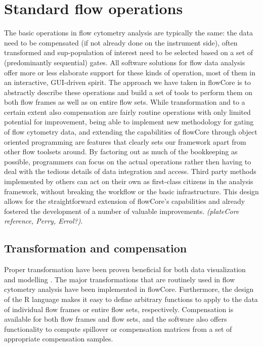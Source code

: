 \documentclass[12pt]{article}
\begin{document}
\section*{Standard flow operations}
The basic operations in flow cytometry analysis are typically the
same: the data need to be compensated (if not already done on the
instrument side), often transformed and sup-population of interest
need to be selected based on a set of (predominantly sequential)
gates. All software solutions for flow data analysis offer more or
less elaborate support for these kinds of operation, most of them in
an interactive, GUI-driven spirit. The approach we have taken in
flowCore is to abstractly describe these operations and build a set of
tools to perform them on both flow frames as well as on entire flow
sets. While transformation and to a certain extent also compensation
are fairly routine operations with only limited potential for
improvement, being able to implement new methodology for gating of
flow cytometry data, and extending the capabilities of flowCore
through object oriented programming are features that clearly sets our
framework apart from other flow toolsets around. By factoring out as
much of the bookkeeping as possible, programmers can focus on the
actual operations rather then having to deal with the tedious details
of data integration and access. Third party methods implemented by
others can act on their own as first-class citizens in the analysis
framework, without breaking the workflow or the basic
infrastructure. This design allows for the straightforward extension
of flowCore's capabilities and already fostered the development of a
number of valuable improvements. \citep{lo2008agf,sarkar2008ufv}
\textit{(plateCore reference, Perry, Errol?)}.




\subsection*{Transformation and compensation}
Proper transformation have been proven beneficial for both data
visualization and modelling \citep{lo2008agf}. The major
transformations that are routinely used in flow cytometry analysis
have been implemented in flowCore. Furthermore, the design of the R
language makes it easy to define arbitrary functions to apply to the
data of individual flow frames or entire flow sets,
respectively. Compensation is available for both flow frames and flow
sets, and the software also offers functionality to compute spillover
or compensation matrices from a set of appropriate compensation
samples.
\end{document}
